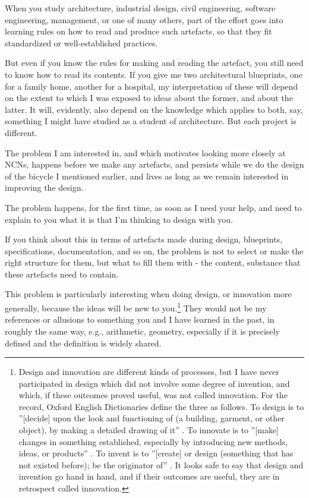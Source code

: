 \documentclass[graybox,envcountchap,sectrefs]{svmono}
\newcommand{\ncn}{NCN}
\begin{document}
When you study architecture, industrial design, civil engineering, software engineering, management, or one of many others, part of the effort goes into learning rules on how to read and produce such artefacts, so that they fit standardized or well-established practices. 

But even if you know the rules for making and reading the artefact, you still need to know how to read its contents. If you give me two architectural blueprints, one for a family home, another for a hospital, my interpretation of these will depend on the extent to which I was exposed to ideas about the former, and about the latter. It will, evidently, also depend on the knowledge which applies to both, say, something I might have studied as a student of architecture. But each project is different. 

The problem I am interested in, and which motivates looking more closely at \ncn s, happens before we make any artefacts, and persists while we do the design of the bicycle I mentioned earlier, and lives as long as we remain interested in improving the design. 

The problem happens, for the first time, as soon as I need your help, and need to explain to you what it is that I'm thinking to design with you. 

If you think about this in terms of artefacts made during design, blueprints, specifications, documentation, and so on, the problem is not to select or make the right structure for them, but what to fill them with - the content, substance that these artefacts need to contain. 

This problem is particularly interesting when doing design, or innovation more generally, because the ideas will be new to you.\footnote{Design and innovation are different kinds of processes, but I have never participated in design which did not involve some degree of invention, and which, if these outcomes proved useful, was not called innovation. For the record, Oxford English Dictionaries define the three as follows. To design is to ''[decide] upon the look and functioning of (a building, garment, or other object), by making a detailed drawing of it'' \cite{def-design}. To innovate is to ''[make] changes in something established, especially by introducing new methods, ideas, or products'' \cite{def-innovate}. To invent is to ''[create] or design (something that has not existed before); be the originator of'' \cite{def-invent}. It looks safe to say that design and invention go hand in hand, and if their outcomes are useful, they are in retrospect called innovation.} They would not be my references or allusions to something you and I have learned in the past, in roughly the same way, e.g., arithmetic, geometry, especially if it is precisely defined and the definition is widely shared. 
\end{document}
